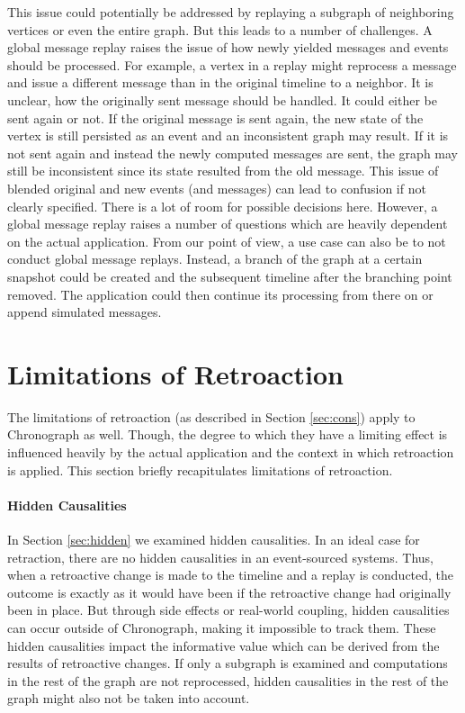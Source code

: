 This issue could potentially be addressed by replaying a subgraph of neighboring 
vertices or even the entire graph.
But this leads to a number of challenges. A global message replay raises the 
issue of how newly yielded messages and events should be processed.
For example, a vertex in a replay might reprocess a message and issue a different 
message than in the original timeline to a neighbor.
It is unclear, how the originally sent message should be handled. It could 
either be sent again or not.
If the original message is sent again, the new state of the vertex is still
persisted as an event and an inconsistent graph may result. If it is not sent 
again and instead the newly computed messages are sent, the graph may still
be inconsistent since its state resulted from the old message.
This issue of blended original and new events (and messages) can lead to 
confusion if not clearly specified.
There is a lot of room for possible decisions here. However, a global message 
replay raises a number of questions which are heavily dependent on the actual 
application. 
From our point of view, a use case can also be to not conduct global message 
replays. Instead, a branch of the graph at a certain snapshot could be created 
and the subsequent timeline after the branching point removed. The application 
could then continue its processing from there on or append simulated messages. 

\section{Limitations of Retroaction}
The limitations of retroaction (as described in Section \ref{sec:cons})
apply to Chronograph as well. Though, the degree to which they have a limiting 
effect is influenced heavily by the actual application and the context in which 
retroaction is applied.
This section briefly recapitulates limitations of retroaction.

\paragraph{Hidden Causalities} 
In Section \ref{sec:hidden} we examined hidden causalities. In an ideal case 
for retraction, there are no hidden causalities in an event-sourced systems. 
Thus, when a retroactive change is made to the timeline and a replay is 
conducted, the outcome is exactly as it would have been if the retroactive 
change had originally been in place.
But through side effects or real-world coupling, hidden causalities can occur 
outside of Chronograph, making it impossible to track them.
These hidden causalities impact the informative value which can be derived 
from the results of retroactive changes. 
If only a subgraph is examined and computations in the rest of the graph
are not reprocessed, hidden causalities in the rest of the graph might also
not be taken into account.

